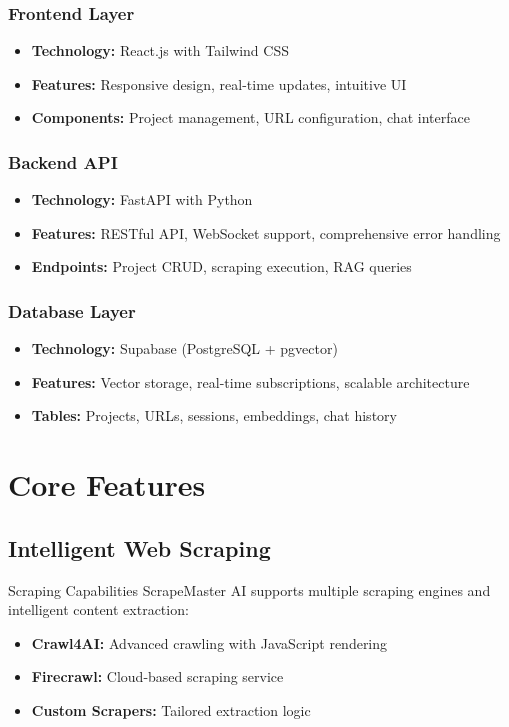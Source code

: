 \documentclass[12pt,a4paper]{report}
\begin{document}
\subsection{Frontend Layer}
\begin{itemize}
    \item \textbf{Technology:} React.js with Tailwind CSS
    \item \textbf{Features:} Responsive design, real-time updates, intuitive UI
    \item \textbf{Components:} Project management, URL configuration, chat interface
\end{itemize}

\subsection{Backend API}
\begin{itemize}
    \item \textbf{Technology:} FastAPI with Python
    \item \textbf{Features:} RESTful API, WebSocket support, comprehensive error handling
    \item \textbf{Endpoints:} Project CRUD, scraping execution, RAG queries
\end{itemize}

\subsection{Database Layer}
\begin{itemize}
    \item \textbf{Technology:} Supabase (PostgreSQL + pgvector)
    \item \textbf{Features:} Vector storage, real-time subscriptions, scalable architecture
    \item \textbf{Tables:} Projects, URLs, sessions, embeddings, chat history
\end{itemize}

\chapter{Core Features}

\section{Intelligent Web Scraping}

\begin{featurebox}{Scraping Capabilities}
ScrapeMaster AI supports multiple scraping engines and intelligent content extraction:
\begin{itemize}
    \item \textbf{Crawl4AI:} Advanced crawling with JavaScript rendering
    \item \textbf{Firecrawl:} Cloud-based scraping service
    \item \textbf{Custom Scrapers:} Tailored extraction logic
\end{itemize}
\end{featurebox}
\end{document}
